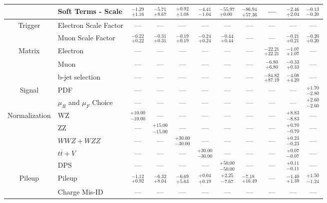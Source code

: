 \begin{tabular}{|cl||ccccccc|c||c|}
\cline{2-11}
&Soft Terms - Scale &  $^{-1.29}_{+1.16}$  &  $^{-5.71}_{+8.67}$  &  $^{+0.92}_{+1.08}$  &  $^{-4.41}_{-1.04}$  &  $^{-55.97}_{+0.00}$  &  $^{-86.94}_{+57.36}$  & --- &  $^{-2.46}_{+2.04}$  &  $^{-0.13}_{-0.20}$ \\ 
\hline
\multirow{2}{*}{Trigger}
&Electron Scale Factor & --- & --- & --- & --- & --- & --- & --- & --- & ---\\ 
\cline{2-11}
&Muon Scale Factor &  $^{-0.22}_{+0.22}$  &  $^{-0.31}_{+0.31}$  &  $^{-0.19}_{+0.19}$  &  $^{-0.24}_{+0.24}$  &  $^{-0.44}_{+0.44}$  & --- & --- &  $^{-0.21}_{+0.21}$  &  $^{-0.20}_{+0.20}$ \\ 
\hline
\multirow{2}{*}{Matrix}
&Electron & --- & --- & --- & --- & --- & --- &  $^{-22.21}_{+22.21}$  &  $^{-1.07}_{+1.07}$  & ---\\ 
\cline{2-11}
\multirow{2}{*}{Method}
&Muon & --- & --- & --- & --- & --- & --- &  $^{-6.80}_{+6.80}$  &  $^{-0.33}_{+0.33}$  & ---\\ 
\cline{2-11}
&b-jet selection & --- & --- & --- & --- & --- & --- &  $^{-84.82}_{+87.19}$  &  $^{-4.08}_{+4.20}$  & ---\\ 
\hline
\multirow{2}{*}{Signal}
&PDF & --- & --- & --- & --- & --- & --- & --- & --- &  $^{+1.70}_{-2.80}$ \\ 
\cline{2-11}
&$\mu_{R}$ and $\mu_{F}$ Choice & --- & --- & --- & --- & --- & --- & --- & --- &  $^{+2.60}_{-2.60}$ \\ 
\hline
\multirow{5}{*}{Normalization}
&WZ &  $^{+10.00}_{-10.00}$  & --- & --- & --- & --- & --- & --- &  $^{+8.83}_{-8.83}$  & ---\\ 
\cline{2-11}
&ZZ & --- &  $^{+15.00}_{-15.00}$  & --- & --- & --- & --- & --- &  $^{+0.70}_{-0.70}$  & ---\\ 
\cline{2-11}
&$WWZ+WZZ$ & --- & --- &  $^{+30.00}_{-30.00}$  & --- & --- & --- & --- &  $^{+0.23}_{-0.23}$  & ---\\ 
\cline{2-11}
&$t\overline{t}+V$ & --- & --- & --- &  $^{+30.00}_{-30.00}$  & --- & --- & --- &  $^{+0.07}_{-0.07}$  & ---\\ 
\cline{2-11}
&DPS & --- & --- & --- & --- &  $^{+50.00}_{-50.00}$  & --- & --- &  $^{+0.11}_{-0.11}$  & ---\\ 
\hline
\multirow{1}{*}{Pileup}
&Pileup &  $^{-1.12}_{+0.92}$  &  $^{-6.32}_{+8.04}$  &  $^{-6.69}_{+5.63}$  &  $^{+0.04}_{+0.19}$  &  $^{+2.25}_{-7.67}$  &  $^{-7.18}_{+16.49}$  & --- &  $^{-1.40}_{+1.39}$  &  $^{+1.50}_{-1.24}$ \\ 
\hline
&Charge Mis-ID & --- & --- & --- & --- & --- & --- & --- & --- & ---\\ 

\end{tabular}
